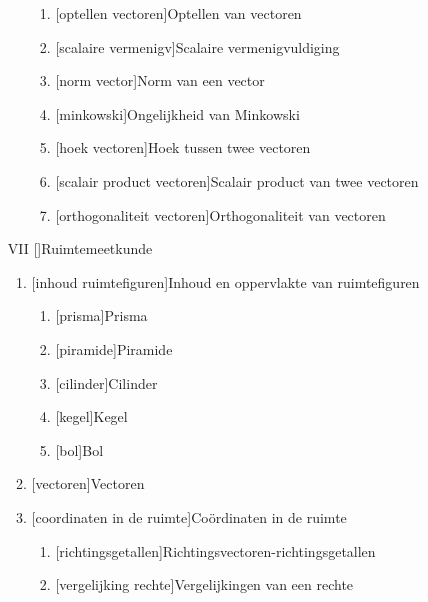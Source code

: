 \documentclass{article}
\begin{document}
\begin{itemize}
\begin{enumerate}
\begin{enumerate}
\item {}[optellen vectoren]{Optellen van vectoren}
\item {}[scalaire vermenigv]{Scalaire vermenigvuldiging}
\item {}[norm vector]{Norm van een vector}
\item {}[minkowski]{Ongelijkheid van Minkowski}
\item {}[hoek vectoren]{Hoek tussen twee vectoren}
\item {}[scalair product vectoren]{Scalair product van twee vectoren}
\item {}[orthogonaliteit vectoren]{Orthogonaliteit van vectoren}
\end{enumerate}%
\end{enumerate}%
\item[VII] []{Ruimtemeetkunde}
\begin{enumerate}%
\item {}[inhoud ruimtefiguren]{Inhoud en oppervlakte van ruimtefiguren}
\begin{enumerate}%
\item {}[prisma]{Prisma}
\item {}[piramide]{Piramide}
\item {}[cilinder]{Cilinder}
\item {}[kegel]{Kegel}
\item {}[bol]{Bol}
\end{enumerate}%
\item {}[vectoren]{Vectoren} 
\item {}[coordinaten in de ruimte]{Co\"ordinaten in de ruimte}
\begin{enumerate}%
\item {}[richtingsgetallen]{Richtingsvectoren-richtingsgetallen}
\item {}[vergelijking rechte]{Vergelijkingen van een rechte}

\end{enumerate}
\end{enumerate}
\end{itemize}
\end{document}
